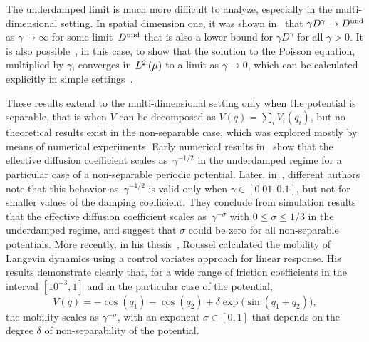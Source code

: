 \documentclass[11pt,a4paper]{article}
\theoremstyle{plain}
\numberwithin{equation}{section}
\renewcommand{\leq}{\leqslant}
\begin{document}
The underdamped limit is much more difficult to analyze,
especially in the multi-dimensional setting.
In spatial dimension one, it was shown in~\cite{MR2394704} that $\gamma D^{\gamma} \to D^{\rm und}$ as $\gamma \to \infty$ for some limit~$D^{\rm und}$
that is also a lower bound for $\gamma D^{\gamma}$ for all $\gamma > 0$.
It is also possible~\cite[Lemma 3.4]{MR2394704}, in this case,
to show that the solution to the Poisson equation,
multiplied by $\gamma$, converges in $\lp{2}{\mu}$ to a limit as $\gamma \to 0$,
which can be calculated explicitly in simple settings~\cite{MR2427108}.

These results extend to the multi-dimensional setting only when the potential is separable,
that is when $V$ can be decomposed as $V(q) = \sum_i V_i(q_i)$,
but no theoretical results exist in the non-separable case,
which was explored mostly by means of numerical experiments.
Early numerical results in~\cite{chen1996surface} show that the effective diffusion coefficient scales as~$\gamma^{-1/2}$ in the underdamped regime for a particular case of a non-separable periodic potential.
Later, in~\cite{Braun02},
different authors note that this behavior as~$\gamma^{-1/2}$ is valid only when $\gamma \in [0.01, 0.1]$,
but not for smaller values of the damping coefficient.
They conclude from simulation results that the effective diffusion coefficient scales as~$\gamma^{-\sigma}$ with $0 \leq \sigma \leq 1/3$ in the underdamped regime,
and suggest that $\sigma$ could be zero for all non-separable potentials.
More recently, in his thesis~\cite{roussel_thesis},
Roussel calculated the mobility of Langevin dynamics  using a control variates approach for linear response.
His results demonstrate clearly that, for a wide range of friction coefficients in the interval $[10^{-3}, 1]$ and in the particular case of the potential,
\[
    V(q) = - \cos(q_1) - \cos(q_2) + \delta \exp \bigl(\sin(q_1 + q_2)\bigr),
\]
the mobility scales as $\gamma^{- \sigma}$,
with an exponent $\sigma \in [0, 1]$ that depends on the degree $\delta$ of non-separability of the potential.
\end{document}
